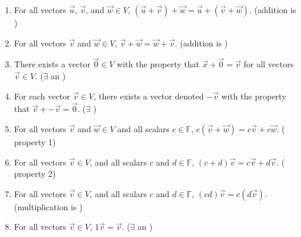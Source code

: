 \documentclass[11pt,fleqn]{book} %
\begin{document}
\begin{enumerate}[label=(\arabic*)]
    \item For all vectors $\overrightarrow{u}$, $\overrightarrow{v}$, and $\overrightarrow{w} \in V$, $(\overrightarrow{u} + \overrightarrow{v}) + \overrightarrow{w} = \overrightarrow{u} + (\overrightarrow{v} + \overrightarrow{w})$. (addition is )

    \item For all vectors $\overrightarrow{v}$ and $\overrightarrow{w} \in V$, $\overrightarrow{v} + \overrightarrow{w} = \overrightarrow{w} + \overrightarrow{v}$. (addition is )

    \item There exists a vector $\overrightarrow{0} \in V$ with the property that $\overrightarrow{x} + \overrightarrow{0} = \overrightarrow{v}$ for all vectors $\overrightarrow{v} \in V$. ($\exists$ an )

    \item For each vector $\overrightarrow{v} \in V$, there exists a vector denoted $-\overrightarrow{v}$ with the property that $\overrightarrow{v} + -\overrightarrow{v} = \overrightarrow{0}$. ($\exists$ )

    \item For all vectors $\overrightarrow{v}$ and $\overrightarrow{w} \in V$  and all scalars $c \in \mathbb{F}$, $c(\overrightarrow{v}+ \overrightarrow{w}) = c\overrightarrow{v} + c\overrightarrow{w}$. ( property 1)

    \item For all vectors $\overrightarrow{v} \in V$, and all scalars $c$ and $d \in \mathbb{F}$, $(c + d)\overrightarrow{v} = c\overrightarrow{v} + d\overrightarrow{v}$. ( property 2)

    \item For all vectors $\overrightarrow{v} \in V$, and all scalars $c$ and $d \in \mathbb{F}$, $(cd)\overrightarrow{v} = c(d\overrightarrow{v})$. (multiplication is )

    \item For all vectors $\overrightarrow{v} \in V$, $1\overrightarrow{v} = \overrightarrow{v}$. ($\exists$ an )
\end{enumerate}
\end{document}
